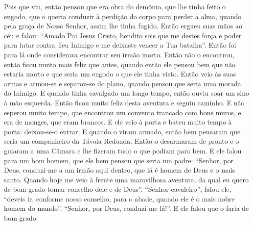 Pois que viu, então pensou que era obra do demônio, que lhe tinha feito o
engodo, que o queria conduzir à perdição do corpo para perder a alma, quando
pela graça de Nosso Senhor, assim lhe tinha fugido. Então ergueu suas mãos ao
céu e falou: “Amado Pai Jesus Cristo, bendito sois que me destes força e poder
para lutar contra Teu Inimigo e me deixaste vencer a Tua batalha”. Então foi
para lá onde considerava encontrar seu irmão morto. Então não o encontrou,
então ficou muito mais feliz que antes, quando então ele pensou bem que não
estaria morto e que seria um engodo o que ele tinha visto. Então veio às suas
armas e armou-se e separou-se do plano, quando pensou que seria uma morada do
Inimigo. E quando tinha cavalgado um longo tempo, então ouviu soar um sino à
mão esquerda. Então ficou muito feliz desta aventura e seguiu caminho. E não
esperou muito tempo, que encontrou um convento trancado com bons muros, e era
de monges, que eram brancos. E ele veio à porta e bateu muito tempo à porta:
deixou-se-o entrar. E quando o viram armado, então bem pensaram que seria um
companheiro da Távola Redonda. Então o desarmaram de pronto e o guiaram a uma
Câmara e lhe fizeram tudo o que podiam para bem. E ele falou para um bom homem,
que ele bem pensou que seria um padre: “Senhor, por Deus, conduzi-me a um irmão
aqui dentro, que lá é homem de Deus e o mais santo. Quando hoje me veio à
frente uma maravilhosa aventura, da qual eu quero de bom grado tomar conselho
dele e de Deus”. “Senhor cavaleiro”, falou ele, “deveis ir, conforme nosso
conselho, para o abade, quando ele é o mais nobre homem do mundo”. “Senhor, por
Deus, conduzi-me lá!”. E ele falou que o faria de bom grado.

